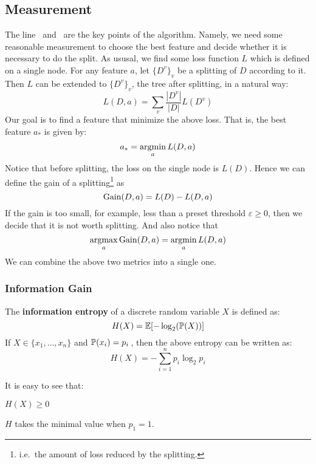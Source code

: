 \subsection{Measurement}

The line~ and~ are the key points of
the algorithm. Namely, we need some reasonable measurement to choose the best feature and decide whether it is
necessary to do the split. As ususal, we find some loss function $L$ which is defined on a single node.
For any feature $a$, let ${\{D^v\}}_v$ be a splitting of $D$ according to it. Then $L$ can be extended to 
${\{D^v\}}_v$, the tree after splitting, in a natural way:
\begin{equation}\label{loss_tree}
    L(D, a) = \sum_v \frac{|D^v|}{|D|}L(D^v)
\end{equation}
Our goal is to find a feature that minimize the above loss. That is, the best feature $a_*$ is given by:
$$a_* = \operatorname*{argmin}_a L(D, a)$$
Notice that before splitting, the loss on the single node is $L(D)$. Hence we can define the gain of a
splitting\footnote{i.e.\ the amount of loss reduced by the splitting.} as 
\begin{equation}
    \operatorname{Gain}(D, a) = L(D) - L(D, a)
\end{equation}
If the gain is too small, for example, less than a preset threshold $\varepsilon \geqslant 0$, then we decide
that it is not worth splitting. And also notice that 
$$\operatorname*{argmax}_a \operatorname{Gain}(D, a) = \operatorname*{argmin}_a L(D, a)$$
We can combine the above two metrics into a single one.

\subsubsection{Information Gain}
\begin{df}
    The \textbf{information entropy} of a discrete random variable $X$ is defined as:
    \begin{equation}
        H(X) = \operatorname*{\mathbb{E}}[-\log_2(\operatorname*{\mathbb{P}}(X))]
    \end{equation}
    If $X \in \{x_1, \dotsc, x_n\}$ and $\operatorname*{\mathbb{P}}(x_i) = p_i$\,, then the above entropy can be written as:
    $$H(X) = -\sum_{i=1}^n p_i\log_2 p_i$$
\end{df}
\begin{re}
    It is easy to see that:
    \begin{compactenum}
        \item $H(X) \geqslant 0$
        \item $H$ takes the minimal value when $p_1 = 1$. 
    \end{compactenum}
\end{re}

